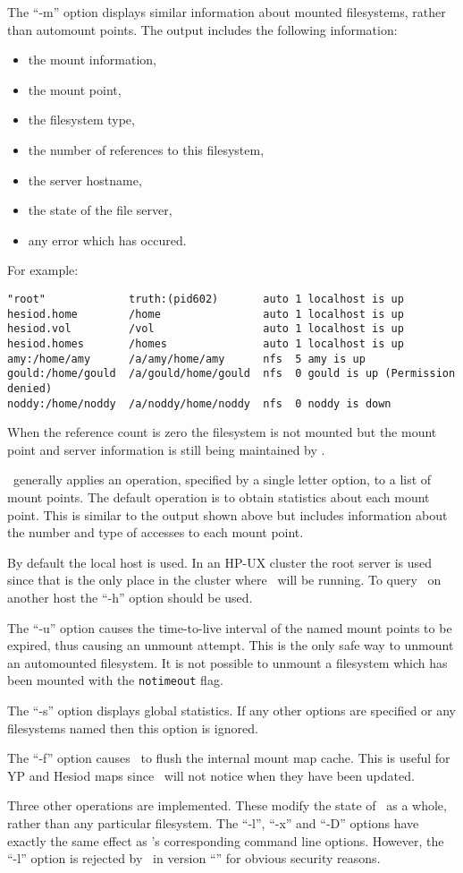 The ``-m'' option displays similar information about mounted filesystems,
rather than automount points.  The output includes the following
information:
\begin{itemize}
\item the mount information,
\item the mount point,
\item the filesystem type,
\item the number of references to this filesystem,
\item the server hostname,
\item the state of the file server,
\item any error which has occured.
\end{itemize}
For example:
\begin{verbatim}
"root"             truth:(pid602)       auto 1 localhost is up
hesiod.home        /home                auto 1 localhost is up
hesiod.vol         /vol                 auto 1 localhost is up
hesiod.homes       /homes               auto 1 localhost is up
amy:/home/amy      /a/amy/home/amy      nfs  5 amy is up
gould:/home/gould  /a/gould/home/gould  nfs  0 gould is up (Permission denied)
noddy:/home/noddy  /a/noddy/home/noddy  nfs  0 noddy is down
\end{verbatim}
When the reference count is zero the filesystem is not mounted but
the mount point and server information is still being maintained
by \amd.

\Amq\ generally applies an operation, specified by a single letter option,
to a list of mount points.  The default operation is to obtain statistics
about each mount point.  This is similar to the output shown above
but includes information about the number and type of accesses to each
mount point.

By default the local host is used.  In an HP-UX cluster the root server
is used since that is the only place in the cluster where \amd\ will be running.
To query \amd\ on another host the ``-h'' option should be used.

The ``-u'' option causes the time-to-live interval of the named mount points
to be expired, thus causing an unmount attempt.  This is the only safe way
to unmount an automounted filesystem.
It is not possible to unmount a filesystem which has been mounted with
the {\tt notimeout} flag.


The ``-s'' option displays global statistics.  If any other options are specified
or any filesystems named then this option is ignored.

The ``-f'' option causes \amd\ to flush the internal mount map cache.  This is
useful for YP and Hesiod maps since \amd\ will not notice when they
have been updated.

Three other operations are implemented.  These modify the state of
\amd\ as a whole, rather than any particular filesystem.
The ``-l'', ``-x'' and ``-D'' options have exactly the same effect
as \amd's corresponding command line options.  However, the ``-l''
option is rejected by \amd\ in version ``\VERSION''
for obvious security reasons.
